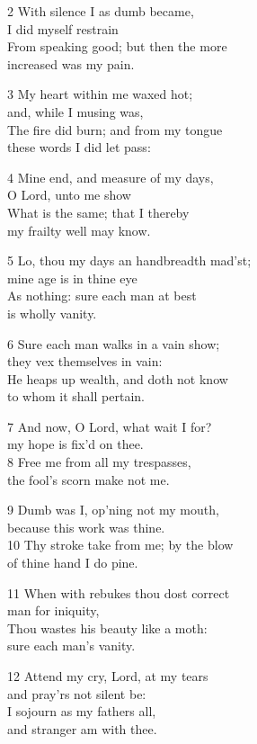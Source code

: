 \begin{multicols}{3}
2 With silence I as dumb became,\\
I did myself restrain\\
From speaking good; but then the more\\
increased was my pain.

3 My heart within me waxed hot;\\
and, while I musing was,\\
The fire did burn; and from my tongue\\
these words I did let pass:

4 Mine end, and measure of my days,\\
O Lord, unto me show\\
What is the same; that I thereby\\
my frailty well may know.

5 Lo, thou my days an handbreadth mad’st;\\
mine age is in thine eye\\
As nothing: sure each man at best\\
is wholly vanity.

6 Sure each man walks in a vain show;\\
they vex themselves in vain:\\
He heaps up wealth, and doth not know\\
to whom it shall pertain.

7 And now, O Lord, what wait I for?\\
my hope is fix’d on thee.\\
8 Free me from all my trespasses,\\
the fool’s scorn make not me.

9 Dumb was I, op’ning not my mouth,\\
because this work was thine.\\
10 Thy stroke take from me; by the blow\\
of thine hand I do pine.

11 When with rebukes thou dost correct\\
man for iniquity,\\
Thou wastes his beauty like a moth:\\
sure each man’s vanity.

12 Attend my cry, Lord, at my tears\\
and pray’rs not silent be:\\
I sojourn as my fathers all,\\
and stranger am with thee.


\end{multicols}
